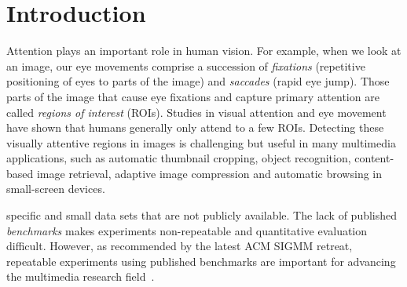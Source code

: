 \chapter{Introduction}
\label{c:intro}

Attention plays an important role in human vision. For example, when
we look at an image, our eye movements comprise a succession of {\em
fixations} (repetitive positioning of eyes to parts of the image)
and {\em saccades} (rapid eye jump). Those parts of the image that
cause eye fixations and capture primary attention are called {\em
regions of interest} (ROIs). Studies in visual attention and eye
movement have shown that humans generally only attend to a few ROIs.
Detecting these visually attentive regions in images is challenging
but useful in many multimedia applications, such as automatic
thumbnail cropping, object recognition, content-based image
retrieval, adaptive image compression and automatic browsing in
small-screen devices.

specific and small data sets that are not publicly available. The
lack of published {\em benchmarks} makes experiments non-repeatable
and quantitative evaluation difficult. However, as recommended by
the latest ACM SIGMM retreat, repeatable experiments using published
benchmarks are important for advancing the multimedia research
field~\cite{Rowe:2005:ASR}.




